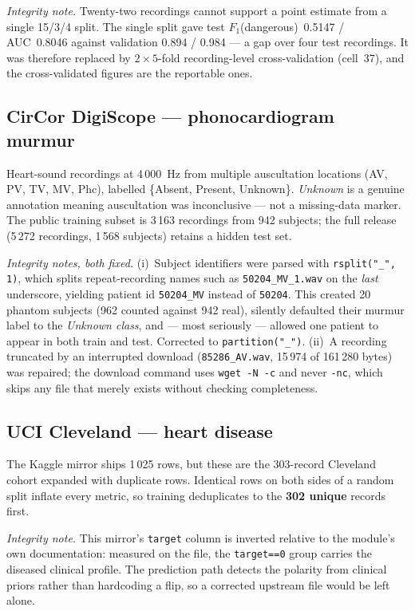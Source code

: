 \documentclass[11pt,a4paper]{article}
\newcommand{\code}[1]{\texttt{\small #1}}
\begin{document}
\emph{Integrity note.} Twenty-two recordings cannot support a point
estimate from a single 15/3/4 split. The single split gave test
$F_1$(dangerous)~0.5147 / AUC~0.8046 against validation 0.894 / 0.984 ---
a gap over four test recordings. It was therefore replaced by
$2\times5$-fold recording-level cross-validation (cell~37), and the
cross-validated figures are the reportable ones.

\subsection{CirCor DigiScope --- phonocardiogram murmur}

Heart-sound recordings at 4\,000~Hz from multiple auscultation locations
(AV, PV, TV, MV, Phc), labelled \{Absent, Present, Unknown\}. \emph{Unknown}
is a genuine annotation meaning auscultation was inconclusive --- not a
missing-data marker. The public training subset is 3\,163 recordings from
942 subjects; the full release (5\,272 recordings, 1\,568 subjects) retains
a hidden test set.

\emph{Integrity notes, both fixed.} (i)~Subject identifiers were parsed
with \code{rsplit("\_", 1)}, which splits repeat-recording names such as
\code{50204\_MV\_1.wav} on the \emph{last} underscore, yielding patient id
\code{50204\_MV} instead of \code{50204}. This created 20 phantom subjects
(962 counted against 942 real), silently defaulted their murmur label to
the \emph{Unknown class}, and --- most seriously --- allowed one patient to
appear in both train and test. Corrected to \code{partition("\_")}.
(ii)~A recording truncated by an interrupted download
(\code{85286\_AV.wav}, 15\,974 of 161\,280 bytes) was repaired; the
download command uses \code{wget -N -c} and never \code{-nc}, which skips
any file that merely exists without checking completeness.

\subsection{UCI Cleveland --- heart disease}

The Kaggle mirror ships 1\,025 rows, but these are the 303-record Cleveland
cohort expanded with duplicate rows. Identical rows on both sides of a
random split inflate every metric, so training deduplicates to the
\textbf{302 unique} records first.

\emph{Integrity note.} This mirror's \code{target} column is inverted
relative to the module's own documentation: measured on the file, the
\code{target==0} group carries the diseased clinical profile. The
prediction path detects the polarity from clinical priors rather than
hardcoding a flip, so a corrected upstream file would be left alone.
\end{document}
